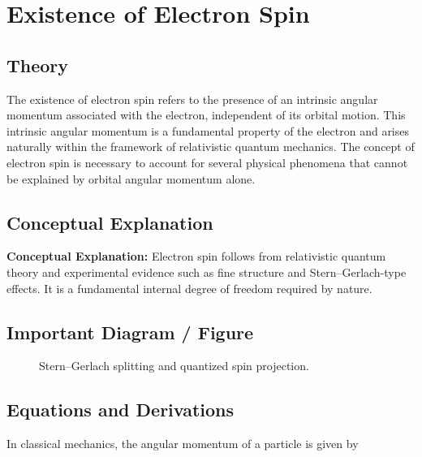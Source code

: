 \documentclass[12pt]{report}
\begin{document}
\section{Existence of Electron Spin}



\subsection*{Theory}

The existence of electron spin refers to the presence of an intrinsic angular momentum associated with the electron, independent of its orbital motion. This intrinsic angular momentum is a fundamental property of the electron and arises naturally within the framework of relativistic quantum mechanics. The concept of electron spin is necessary to account for several physical phenomena that cannot be explained by orbital angular momentum alone.


\subsection{Conceptual Explanation}
\textbf{Conceptual Explanation:} Electron spin follows from relativistic quantum theory and experimental evidence such as fine structure and Stern–Gerlach-type effects. It is a fundamental internal degree of freedom required by nature.



\subsection*{Important Diagram / Figure}
\begin{figure}[H]
    \centering
    \caption{Stern--Gerlach splitting and quantized spin projection.}
\end{figure}

\subsection*{Equations and Derivations}

In classical mechanics, the angular momentum of a particle is given by
\end{document}

